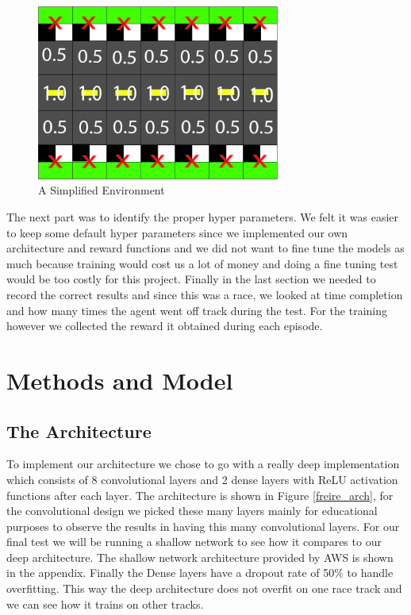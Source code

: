 \documentclass[journal]{IEEEtran}
\begin{document}
\begin{figure}[htbp]
\begin{center}
\includegraphics[width=8cm]{AWS-simplifiedTrack}
\end{center}
\vspace{-2mm}
\caption{A Simplified Environment}
\label{simplifiedTrack}
\end{figure}

The next part was to identify the proper hyper parameters.  We felt it was easier to keep some default hyper parameters since we implemented our own architecture and reward functions and we did not want to fine tune the models as much because training would cost us a lot of money and doing a fine tuning test would be too costly for this project.  
Finally in the last section we needed to record the correct results and since this was a race, we looked at time completion and how many times the agent went off track during the test.  For the training however we collected the reward it obtained during each episode.

\section{Methods and Model}
\subsection{The Architecture}
To implement our architecture we chose to go with a really deep implementation which consists of 8 convolutional layers and 2 dense layers with ReLU activation functions after each layer. The architecture is shown in Figure \ref{freire_arch}, for the convolutional design we picked these many layers mainly for educational purposes to observe the results in having this many convolutional layers.  For our final test we will be running a shallow network to see how it compares to our deep architecture.  The shallow network architecture provided by AWS is shown in the appendix.  Finally the Dense layers have a dropout rate of 50\% to handle overfitting.  This way the deep architecture does not overfit on one race track and we can see how it trains on other tracks.
\end{document}
